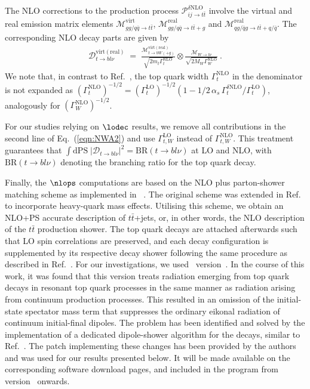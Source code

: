 The NLO corrections to the production process $\mathcal{P}_{ij \to t\bar{t}}^{\delta \mathrm{NLO}}$ involve the virtual and real emission matrix elements
$\mathcal{M}_{gg/q\bar{q} \to t\bar{t}}^{\mathrm{virt}}$, $\mathcal{M}_{gg/q\bar{q} \to t\bar{t}+g}^{\mathrm{real}}$ and
$\mathcal{M}_{qg/\bar{q}g \to t\bar{t}+q/\bar{q}}^{\mathrm{real}}$.
The corresponding NLO decay parts are given by
\begin{eqnarray}\label{eqn:NWAdecay}
\mathcal{D}^\mathrm{virt (real)}_{t\to b l \nu}\;=\;\frac{\mathcal{M}^\mathrm{virt (real)}_{t\to b W (+g)}}{\sqrt{2 m_t \Gamma_t^\mathrm{NLO}}} \otimes
\frac{\mathcal{M}_{W \to l \nu}}{\sqrt{2 M_W  \Gamma_W^\mathrm{NLO}}}~.
\end{eqnarray}
We note that, in contrast to Ref.~\cite{Melnikov:2009dn}, the top quark width $\Gamma_t^\mathrm{NLO}$ in the denominator is not expanded
as $(\Gamma_t^\mathrm{NLO})^{-1/2}=(\Gamma_t^\mathrm{LO})^{-1/2}
\left( 1 - 1/2 \, \alpha_s \, \Gamma_t^{\delta
    \mathrm{NLO}}/\Gamma_t^\mathrm{LO} \right) $, analogously for $(\Gamma_W^\mathrm{NLO})^{-1/2}$.

For our studies relying on $\lodec$ results, we remove all
contributions in the second line of Eq.~(\ref{eqn:NWA2}) and use
$\Gamma_{t,W}^\mathrm{LO}$ instead of $\Gamma_{t,W}^\mathrm{NLO}$. This
treatment guarantees that
$\int \! \mathrm{d}\mathrm{PS} \; |\mathcal{D}_{t\to b l \nu}|^2 =
\mathrm{BR}(t\to bl\nu)$ at LO and NLO, with $\mathrm{BR}(t\to bl\nu)$
denoting the branching ratio for the top quark decay.


Finally, the $\nlops$ computations are based on the
NLO plus parton-shower matching scheme as implemented in
~\cite{Hoeche:2011fd}. The original scheme was extended in
Ref.~\cite{Hoeche:2013mua} to incorporate heavy-quark mass effects.
Utilising this scheme, we obtain an NLO+PS accurate description of
$t\bar t$+jets, or, in other words, the NLO description of the
$t\bar t$ production shower. The top quark decays are attached
afterwards such that LO spin correlations are preserved, and each decay
configuration is supplemented by its respective decay shower following
the same procedure as described in Ref.~\cite{Hoche:2014kca}.
For our investigations, we used ~version~.
In the course of this work, it was found that this version treats
radiation emerging from top quark decays in resonant top quark
processes in the same manner as radiation arising from continuum
production processes. This resulted in an omission of the
initial-state spectator mass term that suppresses the ordinary eikonal
radiation of continuum initial-final dipoles.
The problem has been identified and solved by
the implementation of a dedicated dipole-shower algorithm for the
decays, similar to Ref.~\cite{Hamilton:2006ms}. The patch implementing
these changes has been provided by the  authors and was
used for our results presented below. It will be made available on the
corresponding software download pages, and included in the
 program from version~ onwards.

